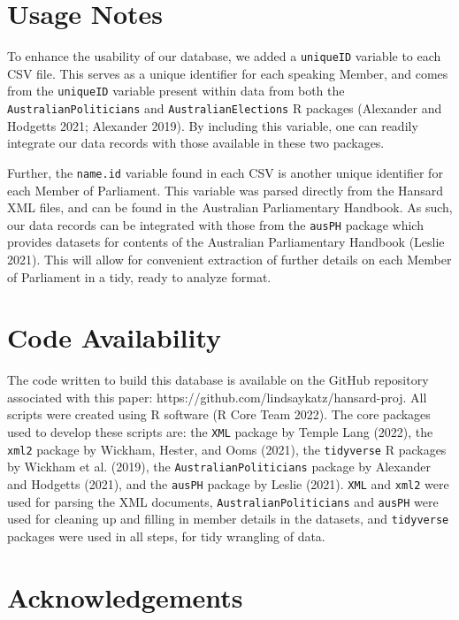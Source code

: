 \documentclass[
  letterpaper,
  DIV=11,
  numbers=noendperiod]{scrartcl}
\begin{document}
\hypertarget{sec-usage}{%
\section{Usage Notes}\label{sec-usage}}

To enhance the usability of our database, we added a \texttt{uniqueID}
variable to each CSV file. This serves as a unique identifier for each
speaking Member, and comes from the \texttt{uniqueID} variable present
within data from both the \texttt{AustralianPoliticians} and
\texttt{AustralianElections} R packages (Alexander and Hodgetts 2021;
Alexander 2019). By including this variable, one can readily integrate
our data records with those available in these two packages.

Further, the \texttt{name.id} variable found in each CSV is another
unique identifier for each Member of Parliament. This variable was
parsed directly from the Hansard XML files, and can be found in the
Australian Parliamentary Handbook. As such, our data records can be
integrated with those from the \texttt{ausPH} package which provides
datasets for contents of the Australian Parliamentary Handbook (Leslie
2021). This will allow for convenient extraction of further details on
each Member of Parliament in a tidy, ready to analyze format.

\hypertarget{code-availability}{%
\section{Code Availability}\label{code-availability}}

The code written to build this database is available on the GitHub
repository associated with this paper:
https://github.com/lindsaykatz/hansard-proj. All scripts were created
using R software (R Core Team 2022). The core packages used to develop
these scripts are: the \texttt{XML} package by Temple Lang (2022), the
\texttt{xml2} package by Wickham, Hester, and Ooms (2021), the
\texttt{tidyverse} R packages by Wickham et al. (2019), the
\texttt{AustralianPoliticians} package by Alexander and Hodgetts (2021),
and the \texttt{ausPH} package by Leslie (2021). \texttt{XML} and
\texttt{xml2} were used for parsing the XML documents,
\texttt{AustralianPoliticians} and \texttt{ausPH} were used for cleaning
up and filling in member details in the datasets, and \texttt{tidyverse}
packages were used in all steps, for tidy wrangling of data.

\hypertarget{acknowledgements}{%
\section{Acknowledgements}\label{acknowledgements}}
\end{document}
